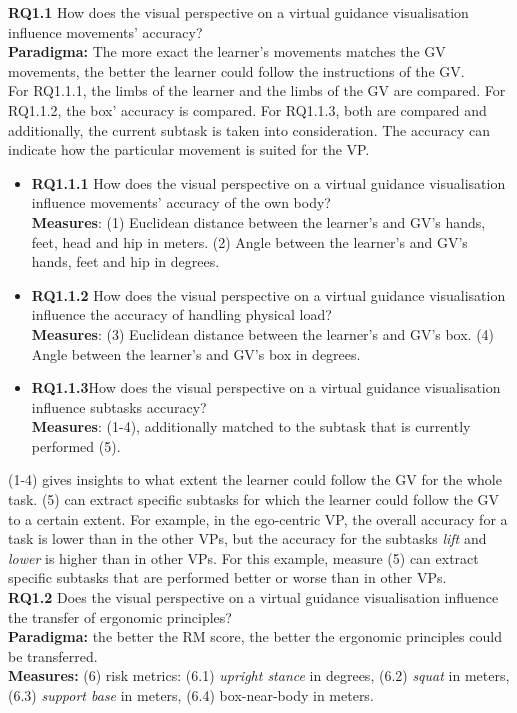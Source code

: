\textbf{RQ1.1} How does the visual perspective on a virtual guidance visualisation influence movements' accuracy?\\
\textbf{Paradigma:} The more exact the learner's movements matches the GV movements, the better the learner could follow the instructions of the GV.\\
For RQ1.1.1, the limbs of the learner and the limbs of the GV are compared. For RQ1.1.2, the box' accuracy is compared. For RQ1.1.3, both are compared and additionally, the current subtask is taken into consideration. The accuracy can indicate how the particular movement is suited for the VP.
\begin{itemize}
	\item[] \textbf{RQ1.1.1} How does the visual perspective on a virtual guidance visualisation influence movements' accuracy of the own body?\\
	\textbf{Measures}: (1) Euclidean distance between the learner's and GV's hands, feet, head and hip in meters. (2) Angle between the learner's and GV's hands, feet and hip in degrees.
	
	\item[] \textbf{RQ1.1.2} How does the visual perspective on a virtual guidance visualisation influence the accuracy of handling physical load?\\
	\textbf{Measures}: (3) Euclidean distance between the learner's and GV's box. (4) Angle between the learner's and GV's box in degrees.
	
	\item[] \textbf{RQ1.1.3}How does the visual perspective on a virtual guidance visualisation influence subtasks accuracy?\\
	\textbf{Measures}: (1-4), additionally matched to the subtask that is currently performed (5).
\end{itemize}	
(1-4) gives insights to what extent the learner could follow the GV for the whole task. (5) can extract specific subtasks for which the learner could follow the GV to a certain extent. For example, in the ego-centric VP, the overall accuracy for a task is lower than in the other VPs, but the accuracy for the subtasks \textit{lift} and \textit{lower} is higher than in other VPs. For this example, measure (5) can extract specific subtasks that are performed better or worse than in other VPs.\\

\textbf{RQ1.2} Does the visual perspective on a virtual guidance visualisation influence the transfer of ergonomic principles?\\
\textbf{Paradigma:} the better the RM score, the better the ergonomic principles could be transferred.\\
\textbf{Measures:} (6) risk metrics: (6.1) \textit{upright stance} in degrees, (6.2) \textit{squat} in meters, (6.3) \textit{support base} in meters, (6.4) box-near-body in meters.\\

